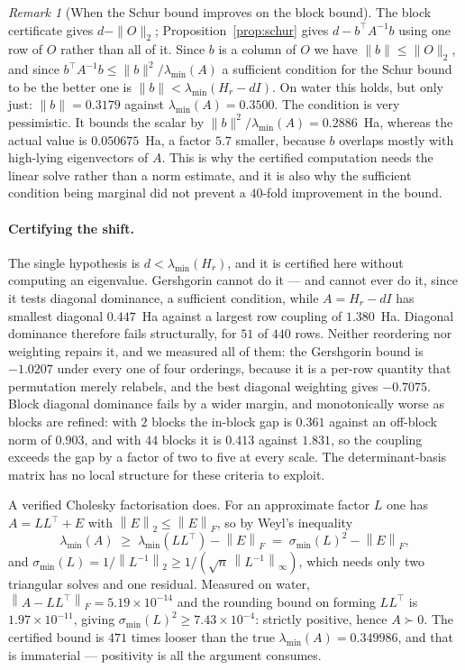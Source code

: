 \documentclass[11pt,a4paper]{article}
\theoremstyle{plain}
\theoremstyle{definition}
\theoremstyle{remark}
\newtheorem{remark}[theorem]{Remark}
\newcommand{\norm}[1]{\left\lVert #1\right\rVert}
\begin{document}
\begin{remark}[When the Schur bound improves on the block bound]
\label{rem:schur-vs-block}
The block certificate gives $d-\|O\|_2$; Proposition~\ref{prop:schur} gives
$d-b^\top A^{-1}b$ using one row of $O$ rather than all of it. Since $b$ is a column
of $O$ we have $\|b\|\le\|O\|_2$, and since $b^\top A^{-1}b\le\|b\|^{2}/\lambda_{\min}(A)$
a sufficient condition for the Schur bound to be the better one is
$\|b\|<\lambda_{\min}(H_r-dI)$. On water this holds, but only just:
$\|b\|=0.3179$ against $\lambda_{\min}(A)=0.3500$.
The condition is very pessimistic. It bounds the scalar by
$\|b\|^{2}/\lambda_{\min}(A)=0.2886$~Ha, whereas the actual value is
$0.050675$~Ha, a factor $5.7$ smaller, because $b$ overlaps mostly with high-lying
eigenvectors of $A$. This is why the certified computation needs the linear solve
rather than a norm estimate, and it is also why the sufficient condition being
marginal did not prevent a $40$-fold improvement in the bound.
\end{remark}

\paragraph{Certifying the shift.}
The single hypothesis is $d < \lambda_{\min}(H_r)$, and it is certified here without
computing an eigenvalue. Gershgorin cannot do it --- and cannot ever do it, since it
tests diagonal dominance, a sufficient condition, while $A = H_r-dI$ has smallest
diagonal $0.447$~Ha against a largest row coupling of $1.380$~Ha. Diagonal dominance
therefore fails structurally, for $51$ of $440$ rows. Neither reordering nor
weighting repairs it, and we measured all of them: the Gershgorin bound is
$-1.0207$ under every one of four orderings, because it is a per-row quantity that
permutation merely relabels, and the best diagonal weighting gives $-0.7075$.
Block diagonal dominance fails by a wider margin, and monotonically worse as blocks
are refined: with $2$ blocks the in-block gap is $0.361$ against an off-block norm
of $0.903$, and with $44$ blocks it is $0.413$ against $1.831$, so the coupling
exceeds the gap by a factor of two to five at every scale. The determinant-basis
matrix has no local structure for these criteria to exploit.

A verified Cholesky factorisation does. For an approximate factor $L$ one has
$A = LL^\top + E$ with $\norm{E}_2 \le \norm{E}_F$, so by Weyl's inequality
\[
  \lambda_{\min}(A) \;\ge\; \lambda_{\min}(LL^\top) - \norm{E}_F
  \;=\; \sigma_{\min}(L)^2 - \norm{E}_F,
\]
and $\sigma_{\min}(L) = 1/\norm{L^{-1}}_2 \ge 1/(\sqrt n\,\norm{L^{-1}}_\infty)$,
which needs only two triangular solves and one residual. Measured on water,
$\norm{A-LL^\top}_F = 5.19\times10^{-14}$ and the rounding bound on forming
$LL^\top$ is $1.97\times10^{-11}$, giving $\sigma_{\min}(L)^2 \ge 7.43\times10^{-4}$:
strictly positive, hence $A \succ 0$. The certified bound is $471$ times looser than
the true $\lambda_{\min}(A) = 0.349986$, and that is immaterial --- positivity is all
the argument consumes.
\end{document}
